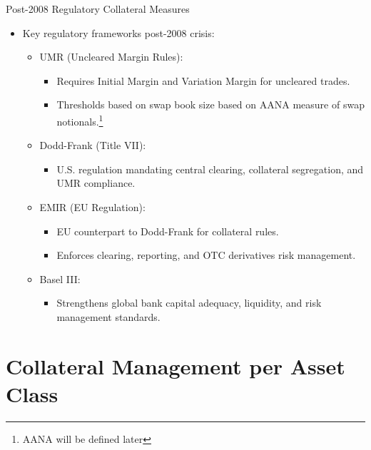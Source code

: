 \documentclass[handout, aspectratio=169]{beamer}
\begin{document}
\begin{frame}{Post-2008 Regulatory Collateral Measures}
    \begin{itemize}
        \item Key regulatory frameworks post-2008 crisis:
        \begin{itemize}
            \item UMR (Uncleared Margin Rules):
            \begin{itemize}
                \item Requires Initial Margin and Variation Margin for uncleared trades.
                \item Thresholds based on swap book size based on AANA measure of swap notionals.\footnote{AANA will be defined later}
            \end{itemize}
            \item Dodd-Frank (Title VII):
            \begin{itemize}
                \item U.S. regulation mandating central clearing, collateral segregation, and UMR compliance.
            \end{itemize}
            \item EMIR (EU Regulation):
            \begin{itemize}
                \item EU counterpart to Dodd-Frank for collateral rules.
                \item Enforces clearing, reporting, and OTC derivatives risk management.
            \end{itemize}
            \item Basel III:
            \begin{itemize}
                \item Strengthens global bank capital adequacy, liquidity, and risk management standards.
            \end{itemize}
        \end{itemize}
    \end{itemize}
\end{frame}
  
\section{Collateral Management per Asset Class}
\end{document}
